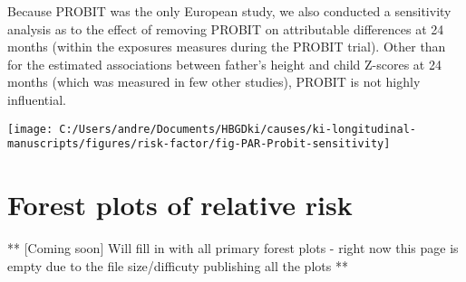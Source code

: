 \documentclass[9pt,]{book}
\begin{document}
Because PROBIT was the only European study, we also conducted a
sensitivity analysis as to the effect of removing PROBIT on attributable
differences at 24 months (within the exposures measures during the
PROBIT trial). Other than for the estimated associations between
father's height and child Z-scores at 24 months (which was measured in
few other studies), PROBIT is not highly influential.

\texttt{[image: C:/Users/andre/Documents/HBGDki/causes/ki-longitudinal-manuscripts/figures/risk-factor/fig-PAR-Probit-sensitivity]}

\chapter{Forest plots of relative risk}\label{RR-forest}

\raggedright

** {[}Coming soon{]} Will fill in with all primary forest plots - right
now this page is empty due to the file size/difficuty publishing all the
plots **


\end{document}
